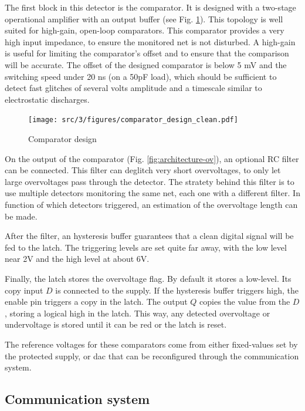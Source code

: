 The first block in this detector is the comparator.
It is designed with a two-stage operational amplifier with an output buffer (see Fig. \ref{fig:comparator-design}).
This topology is well suited for high-gain, open-loop comparators.
This comparator provides a very high input impedance, to ensure the monitored net is not disturbed.
A high-gain is useful for limiting the comparator's offset and to ensure that the comparison will be accurate.
The offset of the designed comparator is below 5 mV and the switching speed under 20 ns (on a 50pF load), which should be sufficient to detect fast glitches of several volts amplitude and a timescale similar to electrostatic discharges.

\begin{figure}[!h]
  \centering
  \texttt{[image: src/3/figures/comparator\_design\_clean.pdf]}
  \caption{Comparator design}
  \label{fig:comparator-design}
\end{figure}

On the output of the comparator (Fig. \ref{fig:architecture-ov}), an optional RC filter can be connected.
This filter can deglitch very short overvoltages, to only let large overvoltages pass through the detector.
The stratety behind this filter is to use multiple detectors monitoring the same net, each one with a different filter.
In function of which detectors triggered, an estimation of the overvoltage length can be made.

After the filter, an hysteresis buffer guarantees that a clean digital signal will be fed to the latch.
The triggering levels are set quite far away, with the low level near 2V and the high level at about 6V.

Finally, the latch stores the overvoltage flag.
By default it stores a low-level.
Its copy input $D$ is connected to the supply.
If the hysteresis buffer triggers high, the enable pin triggers a copy in the latch.
The output $Q$ copies the value from the $D$, storing a logical high in the latch.
This way, any detected overvoltage or undervoltage is stored until it can be red or the latch is reset.

The reference voltages for these comparators come from either fixed-values set by the protected supply, or \gls{dac} that can be reconfigured through the communication system.

\subsection{Communication system}
\label{sec:comm-system-testchip}

